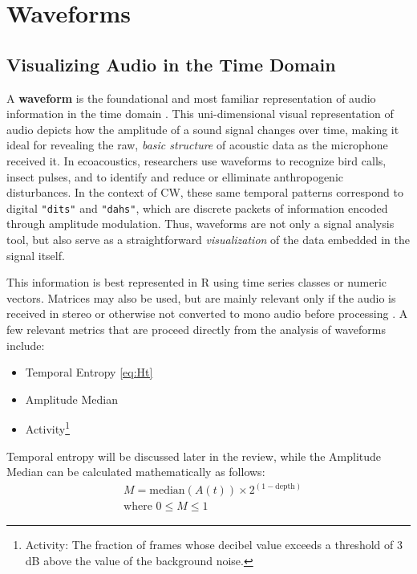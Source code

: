 \documentclass[letterpaper, 12 pt, conference]{ieeeconf}
\begin{document}
\section{Waveforms}
\subsection{Visualizing Audio in the Time Domain}

    A \textbf{waveform} is the foundational and most familiar representation of audio information in the time domain \autocite{Sueur}. This uni-dimensional visual representation of audio depicts how the amplitude of a sound signal changes over time, making it ideal for revealing the raw, \textit{basic structure} of acoustic data as the microphone received it. In ecoacoustics, researchers use waveforms to recognize bird calls, insect pulses, and to identify and reduce or elliminate anthropogenic disturbances. In the context of CW, these same temporal patterns correspond to digital \texttt{"dits"} and \texttt{"dahs"}, which are discrete packets of information encoded through amplitude modulation. Thus, waveforms are not only a signal analysis tool, but also serve as a straightforward \textit{visualization} of the data embedded in the signal itself.

    This information is best represented in R using time series classes or numeric vectors. Matrices may also be used, but are mainly relevant only if the audio is received in stereo or otherwise not converted to mono audio before processing \autocite{seewaveCran}. A few relevant metrics that are proceed directly from the analysis of waveforms include:
\begin{itemize}
    \item Temporal Entropy \ref{eq:Ht} \autocite{Sueur}
    \item Amplitude Median \autocite{Depraetere}
    \item Activity\footnote{Activity: The fraction of frames whose decibel value exceeds a threshold of 3 dB above the value of the background noise.} \autocite{Philips} 
\end{itemize}

    Temporal entropy will be discussed later in the review, while the Amplitude Median can be calculated mathematically as follows:
\begin{equation}
    \begin{split}
        &M = \text{median}(A(t))\times2^{(1-\text{depth})} \\
        &\text{where } 0 \le M \le 1
    \end{split}
\end{equation}
\end{document}
